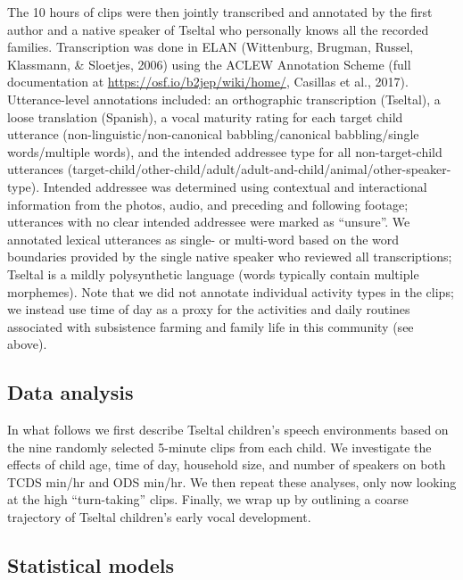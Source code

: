 \documentclass[floatsintext,man]{apa6}
\theoremstyle{definition}
\theoremstyle{definition}
\theoremstyle{definition}
\theoremstyle{remark}
\begin{document}
The 10 hours of clips were then jointly transcribed and annotated by the
first author and a native speaker of Tseltal who personally knows all
the recorded families. Transcription was done in ELAN (Wittenburg,
Brugman, Russel, Klassmann, \& Sloetjes, 2006) using the ACLEW
Annotation Scheme (full documentation at
\url{https://osf.io/b2jep/wiki/home/}, Casillas et al., 2017).
Utterance-level annotations included: an orthographic transcription
(Tseltal), a loose translation (Spanish), a vocal maturity rating for
each target child utterance (non-linguistic/non-canonical
babbling/canonical babbling/single words/multiple words), and the
intended addressee type for all non-target-child utterances
(target-child/other-child/adult/adult-and-child/animal/other-speaker-type).
Intended addressee was determined using contextual and interactional
information from the photos, audio, and preceding and following footage;
utterances with no clear intended addressee were marked as
\enquote{unsure}. We annotated lexical utterances as single- or
multi-word based on the word boundaries provided by the single native
speaker who reviewed all transcriptions; Tseltal is a mildly
polysynthetic language (words typically contain multiple morphemes).
Note that we did not annotate individual activity types in the clips; we
instead use time of day as a proxy for the activities and daily routines
associated with subsistence farming and family life in this community
(see above).

\subsection{Data analysis}\label{methods-analysisinfo}

In what follows we first describe Tseltal children's speech environments
based on the nine randomly selected 5-minute clips from each child. We
investigate the effects of child age, time of day, household size, and
number of speakers on both TCDS min/hr and ODS min/hr. We then repeat
these analyses, only now looking at the high \enquote{turn-taking}
clips. Finally, we wrap up by outlining a coarse trajectory of Tseltal
children's early vocal development.

\subsection{Statistical models}\label{statistical-models}
\end{document}
